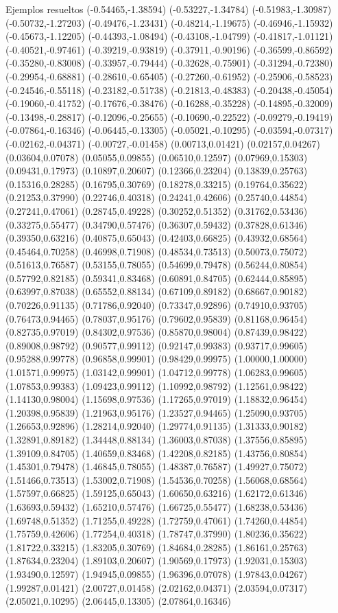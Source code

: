 \documentclass[11pt,a4paper]{article}
\begin{document}
\begin{fmex}{Ejemplos resueltos}
(-0.54465,-1.38594) (-0.53227,-1.34784) (-0.51983,-1.30987) (-0.50732,-1.27203) (-0.49476,-1.23431) (-0.48214,-1.19675) (-0.46946,-1.15932) (-0.45673,-1.12205) (-0.44393,-1.08494) (-0.43108,-1.04799) (-0.41817,-1.01121) (-0.40521,-0.97461) (-0.39219,-0.93819) (-0.37911,-0.90196) (-0.36599,-0.86592) (-0.35280,-0.83008) (-0.33957,-0.79444) (-0.32628,-0.75901) (-0.31294,-0.72380) (-0.29954,-0.68881) (-0.28610,-0.65405) (-0.27260,-0.61952) (-0.25906,-0.58523) (-0.24546,-0.55118) (-0.23182,-0.51738) (-0.21813,-0.48383) (-0.20438,-0.45054) (-0.19060,-0.41752) (-0.17676,-0.38476) (-0.16288,-0.35228) (-0.14895,-0.32009) (-0.13498,-0.28817) (-0.12096,-0.25655) (-0.10690,-0.22522) (-0.09279,-0.19419) (-0.07864,-0.16346) (-0.06445,-0.13305) (-0.05021,-0.10295) (-0.03594,-0.07317) (-0.02162,-0.04371) (-0.00727,-0.01458) (0.00713,0.01421) (0.02157,0.04267) (0.03604,0.07078) (0.05055,0.09855) (0.06510,0.12597) (0.07969,0.15303) (0.09431,0.17973) (0.10897,0.20607) (0.12366,0.23204) (0.13839,0.25763) (0.15316,0.28285) (0.16795,0.30769) (0.18278,0.33215) (0.19764,0.35622) (0.21253,0.37990) (0.22746,0.40318) (0.24241,0.42606) (0.25740,0.44854) (0.27241,0.47061) (0.28745,0.49228) (0.30252,0.51352) (0.31762,0.53436) (0.33275,0.55477) (0.34790,0.57476) (0.36307,0.59432) (0.37828,0.61346) (0.39350,0.63216) (0.40875,0.65043) (0.42403,0.66825) (0.43932,0.68564) (0.45464,0.70258) (0.46998,0.71908) (0.48534,0.73513) (0.50073,0.75072) (0.51613,0.76587) (0.53155,0.78055) (0.54699,0.79478) (0.56244,0.80854) (0.57792,0.82185) (0.59341,0.83468) (0.60891,0.84705) (0.62444,0.85895) (0.63997,0.87038) (0.65552,0.88134) (0.67109,0.89182) (0.68667,0.90182) (0.70226,0.91135) (0.71786,0.92040) (0.73347,0.92896) (0.74910,0.93705) (0.76473,0.94465) (0.78037,0.95176) (0.79602,0.95839) (0.81168,0.96454) (0.82735,0.97019) (0.84302,0.97536) (0.85870,0.98004) (0.87439,0.98422) (0.89008,0.98792) (0.90577,0.99112) (0.92147,0.99383) (0.93717,0.99605) (0.95288,0.99778) (0.96858,0.99901) (0.98429,0.99975) (1.00000,1.00000) (1.01571,0.99975) (1.03142,0.99901) (1.04712,0.99778) (1.06283,0.99605) (1.07853,0.99383) (1.09423,0.99112) (1.10992,0.98792) (1.12561,0.98422) (1.14130,0.98004) (1.15698,0.97536) (1.17265,0.97019) (1.18832,0.96454) (1.20398,0.95839) (1.21963,0.95176) (1.23527,0.94465) (1.25090,0.93705) (1.26653,0.92896) (1.28214,0.92040) (1.29774,0.91135) (1.31333,0.90182) (1.32891,0.89182) (1.34448,0.88134) (1.36003,0.87038) (1.37556,0.85895) (1.39109,0.84705) (1.40659,0.83468) (1.42208,0.82185) (1.43756,0.80854) (1.45301,0.79478) (1.46845,0.78055) (1.48387,0.76587) (1.49927,0.75072) (1.51466,0.73513) (1.53002,0.71908) (1.54536,0.70258) (1.56068,0.68564) (1.57597,0.66825) (1.59125,0.65043) (1.60650,0.63216) (1.62172,0.61346) (1.63693,0.59432) (1.65210,0.57476) (1.66725,0.55477) (1.68238,0.53436) (1.69748,0.51352) (1.71255,0.49228) (1.72759,0.47061) (1.74260,0.44854) (1.75759,0.42606) (1.77254,0.40318) (1.78747,0.37990) (1.80236,0.35622) (1.81722,0.33215) (1.83205,0.30769) (1.84684,0.28285) (1.86161,0.25763) (1.87634,0.23204) (1.89103,0.20607) (1.90569,0.17973) (1.92031,0.15303) (1.93490,0.12597) (1.94945,0.09855) (1.96396,0.07078) (1.97843,0.04267) (1.99287,0.01421) (2.00727,0.01458) (2.02162,0.04371) (2.03594,0.07317) (2.05021,0.10295) (2.06445,0.13305) (2.07864,0.16346) 
\end{fmex}
\end{document}

